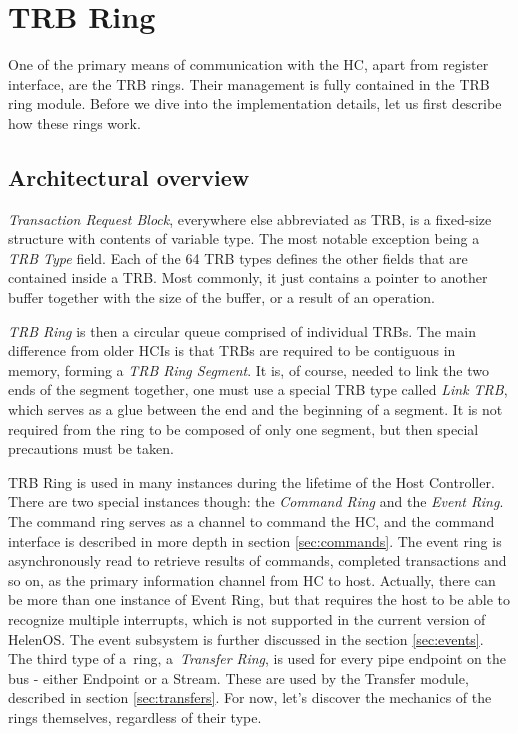 \section{TRB Ring}

One of the primary means of communication with the HC, apart from register
interface, are the TRB rings. Their management is fully contained in the TRB
ring module. Before we dive into the implementation details, let us first
describe how these rings work.

\subsection{Architectural overview}

\emph{Transaction Request Block}, everywhere else abbreviated as TRB, is
a fixed-size structure with contents of variable type. The most notable
exception being a \emph{TRB Type} field. Each of the 64 TRB types defines the
other fields that are contained inside a TRB. Most commonly, it just contains
a pointer to another buffer together with the size of the buffer, or a result
of an operation.

\emph{TRB Ring} is then a circular queue comprised of individual TRBs. The main
difference from older HCIs is that TRBs are required to be contiguous in
memory, forming a \emph{TRB Ring Segment}. It is, of course, needed to link the
two ends of the segment together, one must use a special TRB type called
\emph{Link TRB}, which serves as a glue between the end and the beginning of
a segment. It is not required from the ring to be composed of only one segment,
but then special precautions must be taken.

TRB Ring is used in many instances during the lifetime of the Host Controller.
There are two special instances though: the \emph{Command Ring} and the
\emph{Event Ring}. The command ring serves as a channel to command the HC, and
the command interface is described in more depth in section \ref{sec:commands}.
The event ring is asynchronously read to retrieve results of commands,
completed transactions and so on, as the primary information channel from HC to
host. Actually, there can be more than one instance of Event Ring, but that
requires the host to be able to recognize multiple interrupts, which is not
supported in the current version of HelenOS. The event subsystem is further
discussed in the section \ref{sec:events}. The third type of a~ring,
a~\emph{Transfer Ring}, is used for every pipe endpoint on the bus - either
Endpoint or a Stream. These are used by the Transfer module, described in
section \ref{sec:transfers}. For now, let's discover the mechanics of the rings
themselves, regardless of their type.

